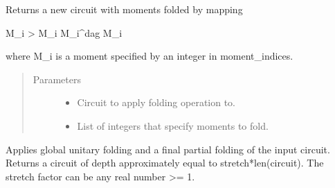 \documentclass[letterpaper,10pt,english]{sphinxmanual}
\begin{document}

\begin{fulllineitems}
\label{\detokenize{index:mitiq.folding_cirq.fold_moments}}
Returns a new circuit with moments folded by mapping

M\_i \sphinxhyphen{}\textgreater{} M\_i M\_i\textasciicircum{}dag M\_i

where M\_i is a moment specified by an integer in moment\_indices.
\begin{quote}\begin{description}
\item[{Parameters}] \leavevmode\begin{itemize}
\item {} 
 \sphinxhyphen{}\sphinxhyphen{} Circuit to apply folding operation to.

\item {} 
 \sphinxhyphen{}\sphinxhyphen{} List of integers that specify moments to fold.

\end{itemize}

\end{description}\end{quote}

\end{fulllineitems}


\begin{fulllineitems}
\label{\detokenize{index:mitiq.folding_cirq.unitary_folding}}
Applies global unitary folding and a final partial folding of the input circuit.
Returns a circuit of depth approximately equal to stretch*len(circuit).
The stretch factor can be any real number \textgreater{}= 1.

\end{fulllineitems}
\end{document}
